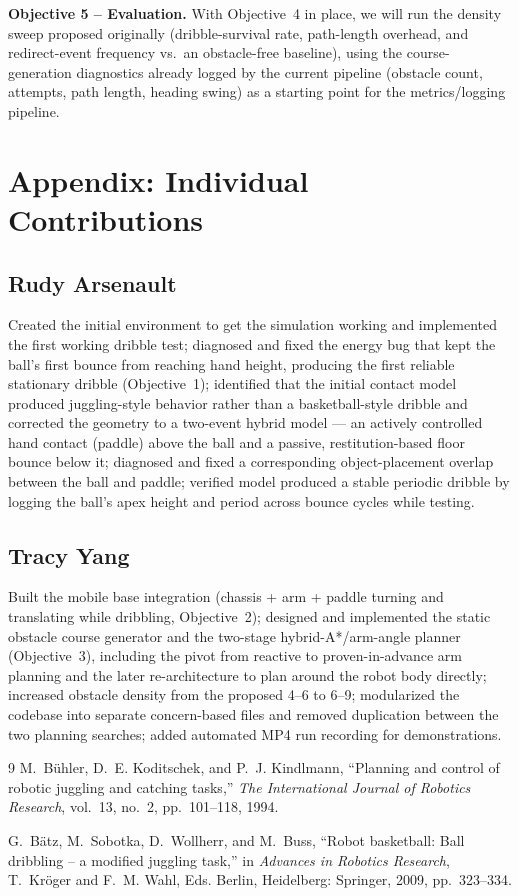 \documentclass[10pt,twocolumn]{article}
\begin{document}
\textbf{Objective 5 -- Evaluation.} With Objective~4 in place, we will run
the density sweep proposed originally (dribble-survival rate, path-length
overhead, and redirect-event frequency vs.\ an obstacle-free baseline),
using the course-generation diagnostics already logged by the current
pipeline (obstacle count, attempts, path length, heading swing) as a
starting point for the metrics/logging pipeline.

\section*{Appendix: Individual Contributions}

\subsection*{Rudy Arsenault}
Created the initial environment to get the simulation working and implemented the first working
dribble test; diagnosed and fixed the energy bug that kept the ball's
first bounce from reaching hand height, producing the first reliable
stationary dribble (Objective~1); identified that the initial contact
model produced juggling-style behavior rather than a basketball-style
dribble and corrected the geometry to a two-event hybrid model --- an
actively controlled hand contact (paddle) above the ball and a passive,
restitution-based floor bounce below it; diagnosed and fixed a
corresponding object-placement overlap between the ball and paddle;
verified model produced a stable periodic dribble by logging the
ball's apex height and period across bounce cycles while testing.

\subsection*{Tracy Yang}
Built the mobile base integration (chassis + arm + paddle turning and
translating while dribbling, Objective~2); designed and implemented the
static obstacle course generator and the two-stage hybrid-A*/arm-angle
planner (Objective~3), including the pivot from reactive to proven-in-advance
arm planning and the later re-architecture to plan around the robot body
directly; increased obstacle density from the proposed 4--6 to 6--9;
modularized the codebase into separate concern-based files and removed
duplication between the two planning searches; added automated MP4 run
recording for demonstrations.

\begin{thebibliography}{9}
 M.~Bühler, D.~E. Koditschek, and P.~J. Kindlmann,
``Planning and control of robotic juggling and catching tasks,''
\emph{The International Journal of Robotics Research}, vol.~13, no.~2,
pp.~101--118, 1994.

 G.~Bätz, M.~Sobotka, D.~Wollherr, and M.~Buss, ``Robot
basketball: Ball dribbling -- a modified juggling task,'' in \emph{Advances
in Robotics Research}, T.~Kröger and F.~M. Wahl, Eds. Berlin, Heidelberg:
Springer, 2009, pp.~323--334.
\end{thebibliography}
\end{document}
